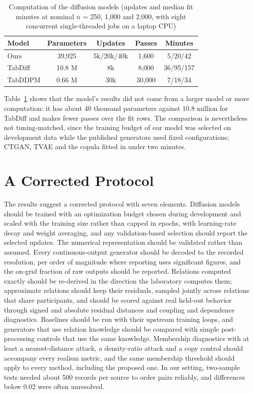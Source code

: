 \documentclass[conference]{IEEEtran}
\begin{document}
\begin{table}[t]
\caption{Computation of the diffusion models (updates and median fit minutes at nominal $n$ = 250, 1,000 and 2,000, with eight concurrent single-threaded jobs on a laptop CPU)}
\label{tab:compute}
\centering
\setlength{\tabcolsep}{2.5pt}
\begin{tabular}{lcccc}
\toprule
Model & Parameters & Updates & Passes & Minutes \\
\midrule
Ours & 39,925 & 5k/20k/40k & 1,600 & 5/20/42 \\
TabDiff & 10.8 M & 8k & 8,000 & 36/95/157 \\
TabDDPM & 0.66 M & 30k & 30,000 & 7/18/34 \\
\bottomrule
\end{tabular}
\end{table}

Table~\ref{tab:compute} shows that the model's results did not come from a larger model or more computation: it has about 40 thousand parameters against 10.8 million for TabDiff and makes fewer passes over the fit rows. The comparison is nevertheless not tuning-matched, since the training budget of our model was selected on development data while the published generators used fixed configurations; CTGAN, TVAE and the copula fitted in under two minutes.

\section{A Corrected Protocol}

The results suggest a corrected protocol with seven elements. Diffusion models should be trained with an optimization budget chosen during development and scaled with the training size rather than capped in epochs, with learning-rate decay and weight averaging, and any validation-based selection should report the selected updates. The numerical representation should be validated rather than assumed. Every continuous-output generator should be decoded to the recorded resolution, per order of magnitude where reporting uses significant figures, and the on-grid fraction of raw outputs should be reported. Relations computed exactly should be re-derived in the direction the laboratory computes them; approximate relations should keep their residuals, sampled jointly across relations that share participants, and should be scored against real held-out behavior through signed and absolute residual distances and coupling and dependence diagnostics. Baselines should be run with their upstream training loops, and generators that use relation knowledge should be compared with simple post-processing controls that use the same knowledge. Membership diagnostics with at least a nearest-distance attack, a density-ratio attack and a copy control should accompany every realism metric, and the same membership threshold should apply to every method, including the proposed one. In our setting, two-sample tests needed about 500 records per source to order pairs reliably, and differences below 0.02 were often unresolved.
\end{document}
